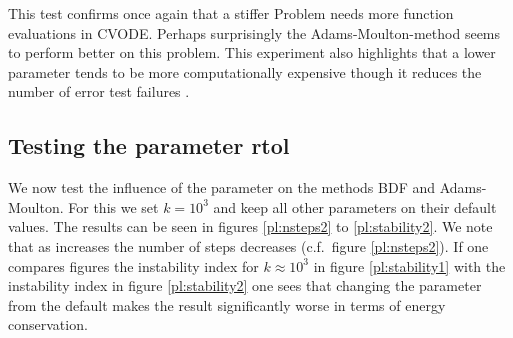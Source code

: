\documentclass{report}
\begin{document}
This test confirms once again that a stiffer Problem needs more function evaluations in CVODE.
Perhaps surprisingly the Adams-Moulton-method seems to perform better on this problem.
This experiment also highlights that a lower  parameter tends to be more computationally expensive though it reduces the number of error test failures .

\subsection*{Testing the parameter rtol}
We now test the influence of the parameter  on the methods BDF and Adams-Moulton. For this we set $k=10^3$ and keep all other parameters on their default values. The results can be seen in figures \ref{pl:nsteps2} to \ref{pl:stability2}. We note that as  increases the number of steps decreases (c.f.\ figure \ref{pl:nsteps2}). If one compares figures the instability index for $k\approx10^3$ in figure \ref{pl:stability1} with the instability index in figure \ref{pl:stability2} one sees that changing the  parameter from the default makes the result significantly worse in terms of energy conservation.
\end{document}
